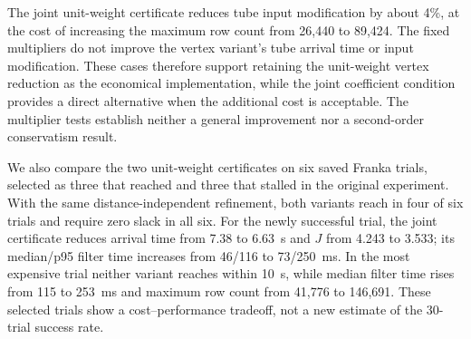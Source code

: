 The joint unit-weight certificate reduces tube input modification by about 4\%, at the cost
of increasing the maximum row count from 26{,}440 to 89{,}424. The fixed multipliers do not
improve the vertex variant's tube arrival time or input modification. These cases therefore
support retaining the unit-weight vertex reduction as the economical implementation, while
the joint coefficient condition provides a direct alternative when the additional cost is
acceptable. The multiplier tests establish neither a general improvement nor a second-order
conservatism result.

We also compare the two unit-weight certificates on six saved Franka trials, selected as three
that reached and three that stalled in the original experiment. With the same distance-independent
refinement, both variants reach in four of six trials and require zero slack in all six.
For the newly successful trial, the joint certificate reduces arrival time from 7.38 to 6.63~s
and $J$ from 4.243 to 3.533; its median/p95 filter time increases from 46/116 to 73/250~ms.
In the most expensive trial neither variant reaches within 10~s, while median filter time rises
from 115 to 253~ms and maximum row count from 41{,}776 to 146{,}691. These selected trials
show a cost--performance tradeoff, not a new estimate of the 30-trial success rate.
